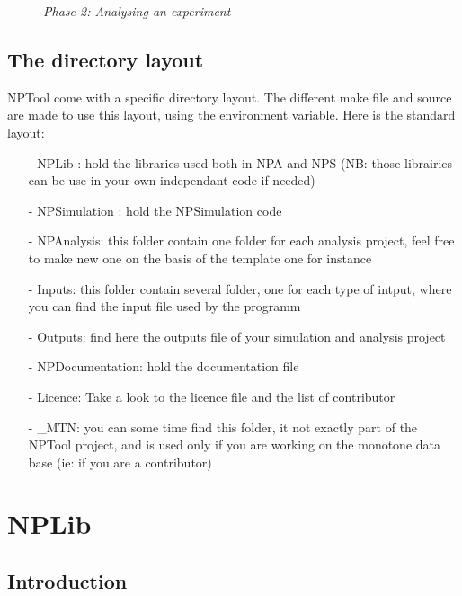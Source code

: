\documentclass{book}
\begin{document}
				\begin{figure}[!htbp]
					\centering
					\caption{ \emph{Phase 2: Analysing an experiment} }
				\end{figure}	
				
				
				
\section{The directory layout}
	NPTool come with a specific directory layout. 
	The different make file and source are made to use this layout, using the environment variable. 
	Here is the standard layout:
		\begin{itemize}
			\item[-] NPLib : hold the libraries used both in NPA and NPS (NB: those librairies can be use in your own independant code if needed)
			\item[-] NPSimulation : hold the NPSimulation code
			\item[-] NPAnalysis: this folder contain one folder for each analysis project, feel free to make new one on the basis of the template one for instance
			\item[-] Inputs: this folder contain several folder, one for each type of intput, where you can find the input file used by the programm
			\item[-] Outputs: find here the outputs file of your simulation and analysis project
			\item[-] NPDocumentation: hold the documentation file
			\item[-] Licence: Take a look to the licence file and the list of contributor
			\item[-] \_MTN: you can some time find this folder, it not exactly part of the NPTool project, and is used only if you are working on the monotone data base (ie: if you are a contributor)
			\item[] 		
		\end{itemize}
\chapter[NPLib]{NPLib}
	\section{Introduction}
	
\end{document}
